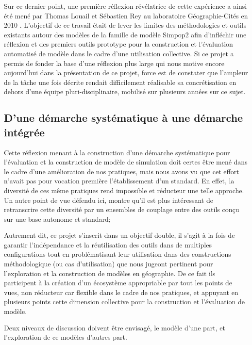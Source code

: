 Sur ce dernier point, une première réflexion révélatrice de cette expérience a ainsi été mené par Thomas Louail et Sébastien Rey au laboratoire Géographie-Cités en 2010 \autocite{Louail2010}. L'objectif de ce travail était de lever les limites des méthodologies et outils existants autour des modèles de la famille de modèle Simpop2 afin d'infléchir une réflexion et des premiers outils prototype pour la construction et l'évaluation automatisé de modèle dans le cadre d'une utilisation collective. Si ce projet a permis de fonder la base d'une réflexion plus large qui nous motive encore aujourd'hui dans la présentation de ce projet, force est de constater que l'ampleur de la tâche une fois décrite rendait difficilement réalisable sa concrétisation en dehors d'une équipe pluri-disciplinaire, mobilisé sur plusieurs années sur ce sujet.


\subsection{D'une démarche systématique à une démarche intégrée}

Cette réflexion menant à la construction d'une démarche systématique pour l'évaluation et la construction de modèle de simulation doit certes être mené dans le cadre d'une amélioration de nos pratiques, mais nous avons vu que cet effort n'avait pas pour vocation première l'établissement d'un standard. En effet, la diversité de ces même pratiques rend impossible et réducteur une telle approche. 
Un autre point de vue défendu ici, montre qu'il est plus intéressant de retranscrire cette diversité par un ensembles de couplage entre des outils conçu sur une base autonome et standard;

Autrement dit, ce projet s'inscrit dans un objectif double, il s'agit à la fois de garantir l'indépendance et la réutilisation des outils dans de multiples configurations tout en problématisant leur utilisation dans des constructions méthodologique (ou cas d'utilisation) que nous jugeont pertinent pour l'exploration et la construction de modèles en géographie. De ce fait ils participent à la création d'un écosystème appropriable par tout les points de vues, non réducteur car flexible dans le cadre de nos pratiques, et appuyant en plusieurs points cette dimension collective pour la construction et l'évaluation de modèle.

Deux niveaux de discussion doivent être envisagé, le modèle d'une part, et l'exploration de ce modèles d'autres part.

